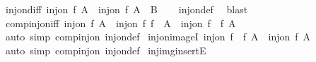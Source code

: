 \begin{isabellebody}
\ inj{\isacharunderscore}{\kern0pt}on{\isacharunderscore}{\kern0pt}diff{\isacharcolon}{\kern0pt}\ {\isachardoublequoteopen}inj{\isacharunderscore}{\kern0pt}on\ f\ A\ {\isasymLongrightarrow}\ inj{\isacharunderscore}{\kern0pt}on\ f\ {\isacharparenleft}{\kern0pt}A\ {\isacharminus}{\kern0pt}\ B{\isacharparenright}{\kern0pt}{\isachardoublequoteclose}\isanewline
%
\isadelimproof
\ \ %
\endisadelimproof
%
\isatagproof
{}\isamarkupfalse%
\ inj{\isacharunderscore}{\kern0pt}on{\isacharunderscore}{\kern0pt}def\ \isamarkupfalse%
\ blast%
\endisatagproof
{\isafoldproof}%
%
\isadelimproof
\isanewline
%
\endisadelimproof
\isanewline
{}\isamarkupfalse%
\ comp{\isacharunderscore}{\kern0pt}inj{\isacharunderscore}{\kern0pt}on{\isacharunderscore}{\kern0pt}iff{\isacharcolon}{\kern0pt}\ {\isachardoublequoteopen}inj{\isacharunderscore}{\kern0pt}on\ f\ A\ {\isasymLongrightarrow}\ inj{\isacharunderscore}{\kern0pt}on\ f{\isacharprime}{\kern0pt}\ {\isacharparenleft}{\kern0pt}f\ {\isacharbackquote}{\kern0pt}\ A{\isacharparenright}{\kern0pt}\ {\isasymlongleftrightarrow}\ inj{\isacharunderscore}{\kern0pt}on\ {\isacharparenleft}{\kern0pt}f{\isacharprime}{\kern0pt}\ {\isasymcirc}\ f{\isacharparenright}{\kern0pt}\ A{\isachardoublequoteclose}\isanewline
%
\isadelimproof
\ \ %
\endisadelimproof
%
\isatagproof
{}\isamarkupfalse%
\ {\isacharparenleft}{\kern0pt}auto\ simp{\isacharcolon}{\kern0pt}\ comp{\isacharunderscore}{\kern0pt}inj{\isacharunderscore}{\kern0pt}on\ inj{\isacharunderscore}{\kern0pt}on{\isacharunderscore}{\kern0pt}def{\isacharparenright}{\kern0pt}%
\endisatagproof
{\isafoldproof}%
%
\isadelimproof
\isanewline
%
\endisadelimproof
\isanewline
{}\isamarkupfalse%
\ inj{\isacharunderscore}{\kern0pt}on{\isacharunderscore}{\kern0pt}imageI{}{\isacharcolon}{\kern0pt}\ {\isachardoublequoteopen}inj{\isacharunderscore}{\kern0pt}on\ {\isacharparenleft}{\kern0pt}f{\isacharprime}{\kern0pt}\ {\isasymcirc}\ f{\isacharparenright}{\kern0pt}\ A\ {\isasymLongrightarrow}\ inj{\isacharunderscore}{\kern0pt}on\ f\ A{\isachardoublequoteclose}\isanewline
%
\isadelimproof
\ \ %
\endisadelimproof
%
\isatagproof
{}\isamarkupfalse%
\ {\isacharparenleft}{\kern0pt}auto\ simp{\isacharcolon}{\kern0pt}\ comp{\isacharunderscore}{\kern0pt}inj{\isacharunderscore}{\kern0pt}on\ inj{\isacharunderscore}{\kern0pt}on{\isacharunderscore}{\kern0pt}def{\isacharparenright}{\kern0pt}%
\endisatagproof
{\isafoldproof}%
%
\isadelimproof
\isanewline
%
\endisadelimproof
\isanewline
{}\isamarkupfalse%
\ inj{\isacharunderscore}{\kern0pt}img{\isacharunderscore}{\kern0pt}insertE{\isacharcolon}{\kern0pt}\isanewline

\end{isabellebody}
